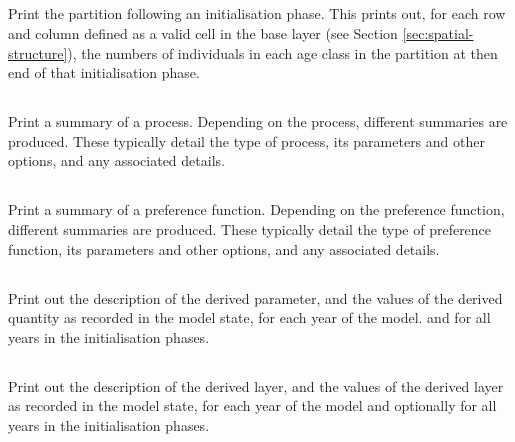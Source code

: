 \subsection{}

Print the partition following an initialisation phase. This prints out, for each row and column defined as a valid cell in the base layer (see Section \ref{sec:spatial-structure}), the numbers of individuals in each age class in the partition at then end of that initialisation phase.

\subsection{}

Print a summary of a process. Depending on the process, different summaries are produced. These typically detail the type of process, its parameters and other options, and any associated details.

\subsection{}

Print a summary of a preference function. Depending on the preference function, different summaries are produced. These typically detail the type of preference function, its parameters and other options, and any associated details.

\subsection{}

Print out the description of the derived parameter, and the values of the derived quantity as recorded in the model state, for each year of the model. and for all years in the  initialisation phases.

\subsection{}

Print out the description of the derived layer, and the values of the derived layer as recorded in the model state, for each year of the model and optionally for all years in the initialisation phases. 

